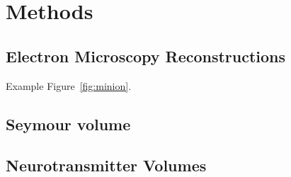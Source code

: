 
\chapter{Methods}

\ifpdf
    \graphicspath{{Chapter2/Figs/Raster/}{Chapter2/Figs/PDF/}{Chapter2/Figs/}}
\else
    \graphicspath{{Chapter2/Figs/Vector/}{Chapter2/Figs/}}
\fi


\section[Short title]{Electron Microscopy Reconstructions}

Example Figure~\ref{fig:minion}.






\section*{Seymour volume}

\section*{Neurotransmitter Volumes}


